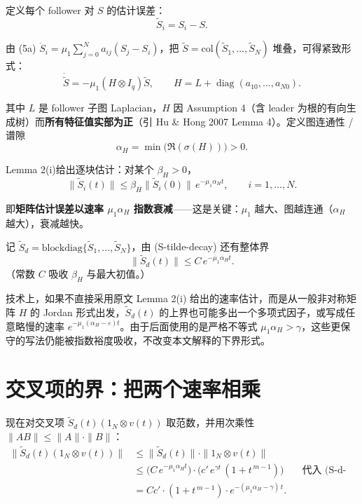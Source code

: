 \documentclass[UTF8]{ctexart}
\begin{document}
定义每个 follower 对 $S$ 的估计误差：
\[
\tilde{S}_i = S_i - S.
\]

由 (5a) $\dot{S}_i = \mu_1 \sum_{j=0}^N a_{ij}(S_j - S_i)$，把 $\tilde{S} = \mathrm{col}(\tilde{S}_1,\dots,\tilde{S}_N)$ 堆叠，可得紧致形式：
\[
\dot{\tilde{S}} = -\mu_1 (H \otimes I_q) \tilde{S},
\qquad
H = L + \operatorname{diag}(a_{10},\dots,a_{N0}).
\]

其中 $L$ 是 follower 子图 Laplacian，$H$ 因 Assumption 4（含 leader 为根的有向生成树）而\textbf{所有特征值实部为正}（引 Hu \& Hong 2007 Lemma 4）。定义图连通性 / 谱隙
\begin{equation}
\alpha_H = \min\bigl(\Re(\sigma(H))\bigr) > 0. \tag{alphaH}
\end{equation}

Lemma 2(i)给出逐块估计：对某个 $\beta_H > 0$，
\begin{equation}
\|\tilde{S}_i(t)\| \le \beta_H \|\tilde{S}_i(0)\| \, e^{-\mu_1 \alpha_H t}, \qquad i=1,\dots,N. \tag{S-tilde-decay}
\end{equation}

即\textbf{矩阵估计误差以速率 $\mu_1 \alpha_H$ 指数衰减}——这是关键：$\mu_1$ 越大、图越连通（$\alpha_H$ 越大），衰减越快。

记 $\tilde{S}_d = \mathrm{blockdiag}\{\tilde{S}_1,\dots,\tilde{S}_N\}$，由 (S-tilde-decay) 还有整体界
\begin{equation}
\|\tilde{S}_d(t)\| \le C \, e^{-\mu_1 \alpha_H t}. \tag{S-d-decay}
\end{equation}
（常数 $C$ 吸收 $\beta_H$ 与最大初值。）

技术上，如果不直接采用原文 Lemma 2(i) 给出的速率估计，而是从一般非对称矩阵 $H$ 的 Jordan 形式出发，$\tilde{S}_d(t)$ 的上界也可能多出一个多项式因子，或写成任意略慢的速率 $e^{-\mu_1(\alpha_H-\varepsilon)t}$。由于后面使用的是严格不等式 $\mu_1\alpha_H>\gamma$，这些更保守的写法仍能被指数裕度吸收，不改变本文解释的下界形式。

\section{交叉项的界：把两个速率相乘}

现在对交叉项 $\tilde{S}_d(t)(1_N \otimes v(t))$ 取范数，并用次乘性 $\|AB\| \le \|A\|\cdot\|B\|$：
\begin{align}
\|\tilde{S}_d(t)(1_N \otimes v(t))\|
&\le \|\tilde{S}_d(t)\| \cdot \|1_N \otimes v(t)\| \\[2mm]
&\le \bigl(C \, e^{-\mu_1 \alpha_H t}\bigr)
   \cdot \bigl(c' \, e^{\gamma t} \, (1+t^{\,m-1})\bigr)
   && \text{代入 (S-d-decay) 与 (v-bound)} \\[2mm]
&= C c' \cdot (1+t^{\,m-1}) \cdot e^{-(\mu_1 \alpha_H - \gamma)\, t}. \tag{cross-bound}
\end{align}
\end{document}
